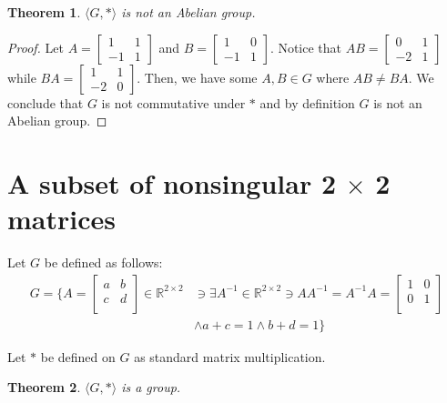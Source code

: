 \documentclass[12pt]{article}
\newcommand{\reals}{\mathbb{R}}
\newtheorem{thm}{Theorem}
\begin{document}
\begin{thm} \label{abel}
	$\langle G, * \rangle $ is not an Abelian group.
\end{thm}

\begin{proof}
	Let $A = \begin{bmatrix} 1 & 1 \\ -1 & 1 \end{bmatrix}$
	and $B = \begin{bmatrix} 1 & 0 \\ -1 & 1 \end{bmatrix}$.
	Notice that $AB = \begin{bmatrix} 0 & 1 \\ -2 & 1 \end{bmatrix}$
	while $BA = \begin{bmatrix} 1 & 1 \\ -2 & 0 \end{bmatrix}$.
	Then, we have some $A,B \in G$ where $AB \neq BA$.
	We conclude that $G$ is not commutative under $*$
	and by definition $G$ is not an Abelian group.
\end{proof}

\section{A subset of nonsingular 2 $\times$ 2 matrices}


Let $G$ be defined as follows:
\begin{align*}
	G = \{A = \begin{bmatrix} a & b \\ c & d \\ \end{bmatrix} \in \reals^{2 \times 2} &
	\ni \exists A^{-1} \in \reals^{2 \times 2} \ni AA^{-1} = A^{-1}A = \begin{bmatrix} 1 & 0 \\ 0 & 1 \\ \end{bmatrix}
\\ & \land a + c = 1 \land b + d = 1\}
\end{align*}

Let $*$ be defined on $G$ as standard matrix multiplication.

\begin{thm} \label{thm:unitcols}
	$\langle G, * \rangle$ is a group.
\end{thm}
\end{document}
